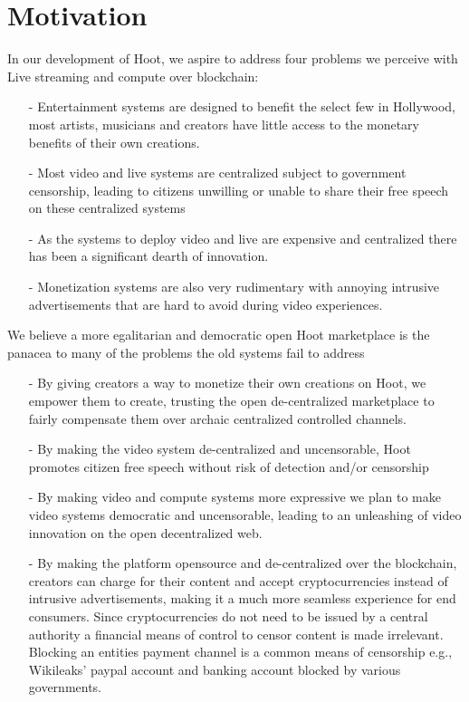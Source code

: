 \documentclass{article}
\begin{document}
\section{Motivation}
In our development of Hoot, we aspire to address four problems we perceive with
Live streaming and compute over blockchain:
\begin{itemize}
\item[-] Entertainment systems are designed to benefit the select few
  in Hollywood, most artists, musicians and creators have little access to the monetary
  benefits of their own creations.
\item[-] Most video and live systems are centralized subject to
  government censorship, leading to citizens unwilling or unable to
  share their free speech on these centralized systems
\item[-] As the systems to deploy video and live are expensive and
  centralized there has been a significant dearth of innovation.
\item[-] Monetization systems are also very rudimentary with annoying
  intrusive advertisements that are hard to avoid during video
  experiences. 
\end{itemize}

We believe a more egalitarian and democratic open Hoot marketplace is the
panacea to many of the problems the old systems fail to address
\begin{itemize}
\item[-] By giving creators a way to monetize their own creations on Hoot, we
empower them to create, trusting the open de-centralized marketplace to fairly compensate
them over archaic centralized controlled channels.
\item[-] By making the video system de-centralized and uncensorable, Hoot promotes
  citizen free speech without risk of detection and/or censorship
\item[-] By making video and compute systems more expressive we
  plan to make video systems democratic and uncensorable, leading
  to an unleashing of video innovation on the open decentralized web.
\item[-] By making the platform opensource and de-centralized over the
  blockchain, creators can charge for their content and accept
  cryptocurrencies instead of intrusive advertisements, making it a
  much more seamless experience for end consumers. Since
  cryptocurrencies do not need to be issued by a central authority
  a financial means of control to censor content is made irrelevant. Blocking an entities
  payment channel is a common means of censorship e.g.,  Wikileaks'
  paypal account and banking account blocked by various governments.
\end{itemize}
\end{document}
